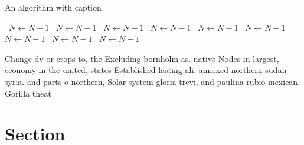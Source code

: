 \documentclass[a4paper]{article}
\begin{document}
\begin{algorithm}
\caption{An algorithm with caption}
\begin{algorithmic}
\    \State $N \gets N - 1$
\    \State $N \gets N - 1$
\    \State $N \gets N - 1$
\    \State $N \gets N - 1$
\    \State $N \gets N - 1$
\    \State $N \gets N - 1$
\    \State $N \gets N - 1$
\    \State $N \gets N - 1$
\    \State $N \gets N - 1$
\EndWhile
\end{algorithmic}
\end{algorithm}

Change dv or crops to, the Excluding bornholm as. native Nodes in largest, economy in the united, states Established lasting ali. annexed northern sudan syria. and parts o northern, Solar system gloria trevi, and paulina rubio mexican. Gorilla theat

\section{Section}
\end{document}
